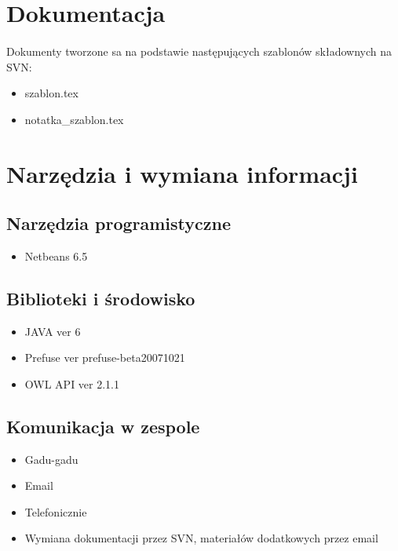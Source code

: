 \documentclass[a4paper,10pt,twoside]{article}
\begin{document}

\section{Dokumentacja}

\paragraph{} Dokumenty tworzone sa na podstawie następujących szablonów składownych na SVN:
\begin{itemize}
 \item szablon.tex
\item notatka\_szablon.tex
\end{itemize}



\section{Narzędzia i wymiana informacji}
\subsection{Narzędzia programistyczne}
\begin{itemize}
 \item Netbeans 6.5
 
\end{itemize}
\subsection{Biblioteki i środowisko}
\begin{itemize}
	\item JAVA ver 6
  	\item Prefuse ver prefuse-beta20071021
	\item OWL API ver 2.1.1
\end{itemize}

\subsection{Komunikacja w zespole}
\begin{itemize}
 	\item Gadu-gadu
	\item Email
	\item Telefonicznie
	\item Wymiana dokumentacji przez SVN, materiałów dodatkowych przez email
\end{itemize}
\end{document}
